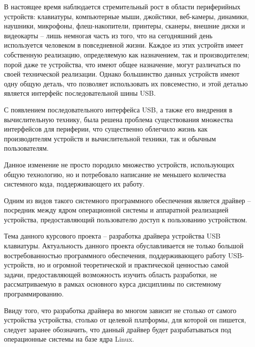 
В настоящее время наблюдается стремительный рост в области периферийных устройств:
клавиатуры, компьютерные мыши, джойстики, веб-камеры, динамики,
наушники, микрофоны, флеш-накопители, принтеры, сканеры,
внешние диски и видеокарты -- лишь немногая часть из того, что на сегодняшний
день используется человеком в повседневной жизни.
Каждое из этих устройтв имеет собственную реализацию,
определяемую как назначением, так и производителем;
порой даже те устройства, что имеют общее назначение,
могут различаться по своей технической реализации.
Однако большинство данных устройств имеют одну общую деталь,
что позволяет использовать их повсеместно,
и этой деталью является интерфейс последовательной шины USB.

С появлением последовательного интерфейса USB, а также его
внедрения в вычислительную технику,
была решена проблема существования множества интерфейсов для
периферии, что существенно облегчило жизнь как производителям
устройств и вычислительной техники, так и обычным пользователям.

Данное изменение не просто породило множество устройств,
использующих общую технологию, но и потребовало написание
не меньшего количества системного кода, поддерживающего их работу.

Одним из видов такого системного программного обеспечения является 
драйвер -- посредник между ядром операционной
системы и аппаратной реализацией устройства, 
предоставляющий пользователю доступ к пользованию устройством.

Тема данного курсового проекта -- разработка драйвера
устройства USB клавиатуры. Актуальность данного проекта обуславливается
не только большой востребованностью программного обеспечения,
поддерживающего работу USB-устройств, 
но и огромной теоретической и практической ценностью самой задачи,
предоставляющей возможность изучить область разработки,
не рассматриваемую в рамках основного курса дисциплины по системному программированию.

Ввиду того, что разработка драйвера во многом зависит не столько от 
самого устройства устройства, столько от целевой платформы, для которой он пишется,
следует заранее обозначить, что данный драйвер будет разрабатываться
под операционные системы на базе ядра Linux.